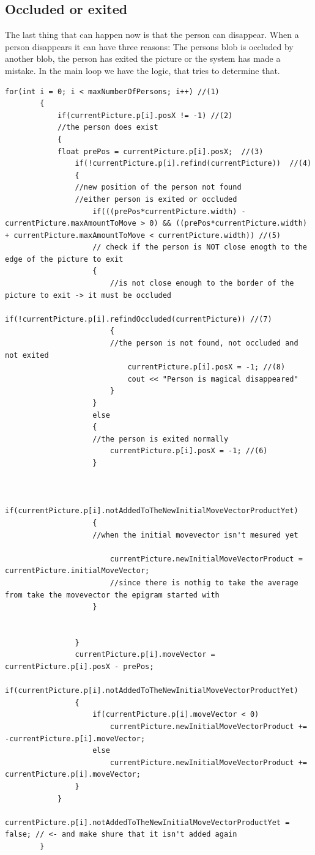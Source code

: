 \subsection{Occluded or exited}
The last thing that can happen now is that the person can disappear. When a person disappears it can have three reasons: The persons blob is occluded by another blob, the person has exited the picture or the system has made a mistake. In the main loop we have the logic, that tries to determine that. 
\begin{lstlisting}
for(int i = 0; i < maxNumberOfPersons; i++) //(1)
		{
			if(currentPicture.p[i].posX != -1) //(2)
			//the person does exist
			{
			float prePos = currentPicture.p[i].posX;  //(3)
				if(!currentPicture.p[i].refind(currentPicture))  //(4)
				{
				//new position of the person not found
				//either person is exited or occluded
					if(((prePos*currentPicture.width) - currentPicture.maxAmountToMove > 0) && ((prePos*currentPicture.width) + currentPicture.maxAmountToMove < currentPicture.width)) //(5)
					// check if the person is NOT close enogth to the edge of the picture to exit
					{
						//is not close enough to the border of the picture to exit -> it must be occluded
						if(!currentPicture.p[i].refindOccluded(currentPicture)) //(7)
						{
						//the person is not found, not occluded and not exited 
							currentPicture.p[i].posX = -1; //(8)
							cout << "Person is magical disappeared"
						}
					}
					else 
					{
					//the person is exited normally 
						currentPicture.p[i].posX = -1; //(6)
					}


					if(currentPicture.p[i].notAddedToTheNewInitialMoveVectorProductYet)
					{ 
					//when the initial movevector isn't mesured yet
					
						currentPicture.newInitialMoveVectorProduct = currentPicture.initialMoveVector; 
						//since there is nothig to take the average from take the movevector the epigram started with
					}


				}
				currentPicture.p[i].moveVector = currentPicture.p[i].posX - prePos;
				if(currentPicture.p[i].notAddedToTheNewInitialMoveVectorProductYet)
				{
					if(currentPicture.p[i].moveVector < 0)
						currentPicture.newInitialMoveVectorProduct += -currentPicture.p[i].moveVector;
					else
						currentPicture.newInitialMoveVectorProduct += currentPicture.p[i].moveVector;
				}
			}
			currentPicture.p[i].notAddedToTheNewInitialMoveVectorProductYet = false; // <- and make shure that it isn't added again
		}
\end{lstlisting}
